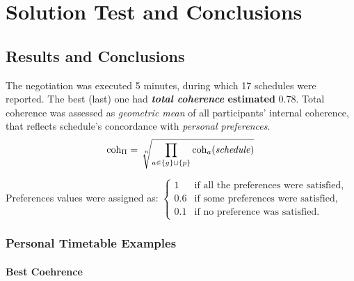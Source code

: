 \documentclass[header]{subfiles}
\providecommand{\rootdir}{.}
\begin{document}
\chapter{Solution Test and Conclusions}
\label{chapter:test}



\section{Results and Conclusions}

The negotiation was executed 5 minutes, during which 17 schedules were reported.
The best (last) one had \textbf{\emph{total coherence} estimated }$\mathbf{0.78}$.
Total coherence was assessed as \emph{geometric mean} of all participants'
internal coherence, that reflects schedule's concordance with \emph{personal preferences}.
$$ \coh_\Pi = \sqrt[\leftroot{-2}\uproot{2}n]
                   {\prod\limits_{a \in \{g\} \cup \{p\}}
                         \coh_a (\mathit{schedule})
                   }
$$

\noindent
Preferences values were assigned as:
$\begin{cases}
  1   & \text{if all the preferences were satisfied,} \\
  0.6 & \text{if some preferences were satisfied,}    \\
  0.1 & \text{if no preference was satisfied.}
\end{cases}$

\subsection{Personal Timetable Examples}
\subsubsection{Best Coehrence}
\end{document}
